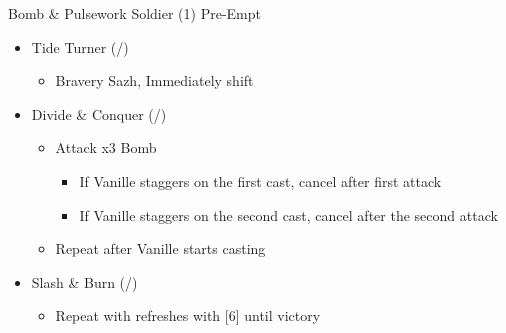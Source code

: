 \begin{multicols}{2}
\renewcommand{\first}{[1] Slash \& Burn (\com/\rav)}
\renewcommand{\second}{[2] Tide Turner (\syn/\sab)}
\renewcommand{\third}{[3] Divide \& Conquer (\com/\sab)}
\renewcommand{\fourth}{[4] Dualcasting (\rav/\rav)}
\renewcommand{\fifth}{[5] Undermine (\rav/\sab)}
\renewcommand{\sixth}{[6] Slash \& Burn (\com/\rav)}



\begin{battle}{Bomb \& Pulsework Soldier (1) Pre-Empt}
\begin{itemize}
    \item \second
    \begin{itemize}
        \item Bravery Sazh, Immediately shift
    \end{itemize}
    \item \third
    \begin{itemize}
        \item Attack x3 Bomb
        \begin{itemize}
            \item If Vanille staggers on the first cast, cancel after first attack
            \item If Vanille staggers on the second cast, cancel after the second attack
        \end{itemize}
        \item Repeat after Vanille starts casting
    \end{itemize}
    \item \first
    \begin{itemize}
        \item Repeat with refreshes with [6] until victory
    \end{itemize}
\end{itemize}
\end{battle}


\end{multicols}
